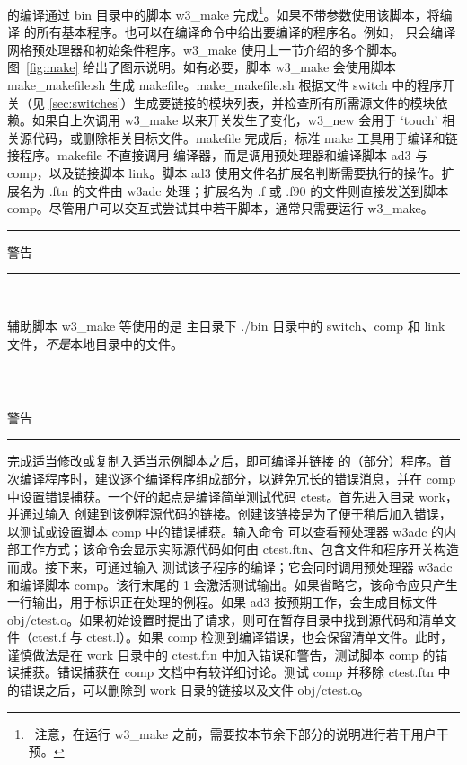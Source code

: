 \ws{} 的编译通过 {\dir bin} 目录中的脚本 {\file w3\_make} 完成\footnote{~注意，在运行 {\file w3\_make} 之前，需要按本节余下部分的说明进行若干用户干预。}。如果不带参数使用该脚本，将编译 \ws{} 的所有基本程序。也可以在编译命令中给出要编译的程序名。例如， 只会编译网格预处理器和初始条件程序。{\file w3\_make} 使用上一节介绍的多个脚本。图~\ref{fig:make} 给出了图示说明。如有必要，脚本 {\file w3\_make} 会使用脚本 {\file make\_makefile.sh} 生成 makefile。{\file make\_makefile.sh} 根据文件 {\file switch} 中的程序开关（见 \para\ref{sec:switches}）生成要链接的模块列表，并检查所有所需源文件的模块依赖。如果自上次调用 {\file w3\_make} 以来开关发生了变化，{\file w3\_new} 会用于 `touch' 相关源代码，或删除相关目标文件。makefile 完成后，标准 \unix{} make 工具用于编译和链接程序。makefile 不直接调用 \fortran{} 编译器，而是调用预处理器和编译脚本 {\file ad3} 与 {\file comp}，以及链接脚本 {\file link}。脚本 {\file ad3} 使用文件名扩展名判断需要执行的操作。扩展名为 {\file .ftn} 的文件由 {\code w3adc} 处理；扩展名为 {\file .f} 或 {\file .f90} 的文件则直接发送到脚本 {\code comp}。尽管用户可以交互式尝试其中若干脚本，通常只需要运行 {\file w3\_make}。



\vspace{\baselineskip}

\begin{center}
\rule[1mm]{55mm}{1.0mm} 警告 \rule[1mm]{55mm}{1.0mm} \\
\vspace{\baselineskip}
\parbox{120mm}{辅助脚本 {\file w3\_make} 等使用的是 \ws{} 主目录下 {\file ./bin} 目录中的 {\file switch}、{\file comp} 和 {\file link} 文件，{\it 不是}本地目录中的文件。} \\ \vspace{\baselineskip} \rule[1mm]{55mm}{1.0mm} 警告
  \rule[1mm]{55mm}{1.0mm}
\end{center}


\noindent
完成适当修改或复制入适当示例脚本之后，即可编译并链接 \ws{} 的（部分）程序。首次编译程序时，建议逐个编译程序组成部分，以避免冗长的错误消息，并在 {\file comp} 中设置错误捕获。一个好的起点是编译简单测试代码 {\F ctest}。首先进入目录 {\dir work}，并通过输入  创建到该例程源代码的链接。创建该链接是为了便于稍后加入错误，以测试或设置脚本 {\file comp} 中的错误捕获。输入命令  可以查看预处理器 {\file w3adc} 的内部工作方式；该命令会显示实际源代码如何由 {\file ctest.ftn}、包含文件和程序开关构造而成。接下来，可通过输入  测试该子程序的编译；它会同时调用预处理器 {\file w3adc} 和编译脚本 {\file comp}。该行末尾的 1 会激活测试输出。如果省略它，该命令应只产生一行输出，用于标识正在处理的例程。如果 {\file ad3} 按预期工作，会生成目标文件 {\file obj/ctest.o}。如果初始设置时提出了请求，则可在暂存目录中找到源代码和清单文件（{\file ctest.f} 与 {\file ctest.l}）。如果 {\file comp} 检测到编译错误，也会保留清单文件。此时，谨慎做法是在 work 目录中的 {\file ctest.ftn} 中加入错误和警告，测试脚本 {\file comp} 的错误捕获。错误捕获在 {\file comp} 文档中有较详细讨论。测试 {\file comp} 并移除 {\file ctest.ftn} 中的错误之后，可以删除到 work 目录的链接以及文件 {\file obj/ctest.o}。


